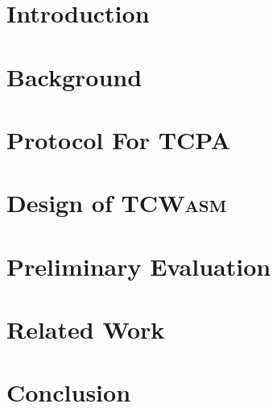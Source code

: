 \documentclass[sigplan,10pt]{acmart}
\newcommand{\tool}{\hbox{\textsc{TCWasm}}\xspace}
\newcommand{\tcpa}{\hbox{TCPA}\xspace}
\begin{document}
				



\section{Introduction}
\label{sec:intro}


\section{Background}
\label{sec:bg}


\section{Protocol For \tcpa}
\label{sec:method}


\section{Design of \tool}
\label{sec:design}


\section{Preliminary Evaluation}
\label{sec:eval}


\section{Related Work}
\label{sec:rw}


\section{Conclusion}
\label{sec:conclusion}






%

\end{document}
